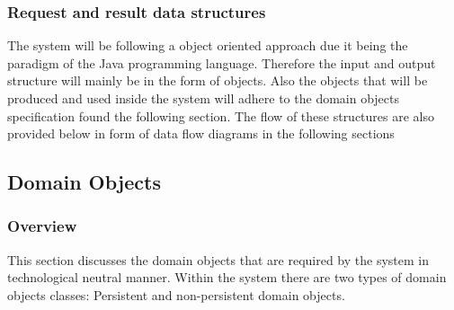 \documentclass[12pt]{article}
\begin{document}
\subsubsection{Request and result data structures}
The system will be following a object oriented approach due it being the paradigm of the Java programming language. Therefore the input and output structure will mainly be in the form of objects. Also the objects that will be produced and used inside the system will adhere to the domain objects specification found the following section. The flow of these structures are also provided below in form of data flow diagrams in the following sections


\newpage
\subsection{Domain Objects}
\subsubsection{Overview}
This section discusses the domain objects that are required by the system in technological neutral manner. Within the system there are two types of domain objects classes: Persistent and non-persistent domain objects.

\newpage
\end{document}
